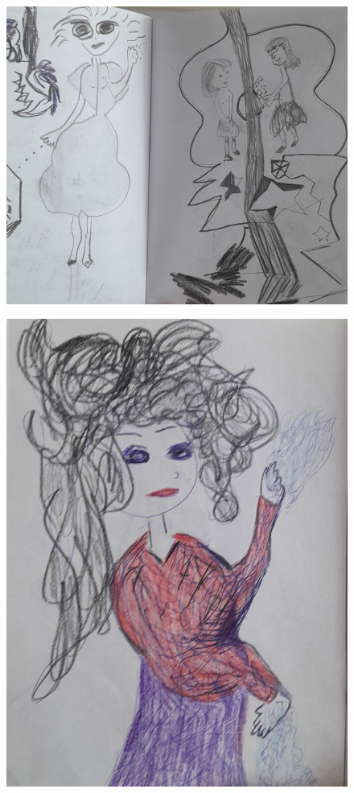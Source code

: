 \documentclass[12pt, a4paper, twoside]{book} %
\begin{document}
\begin{figure}[H]
	\centering
	\includegraphics[width=\textwidth]{./images/1f81324df24ae9.jpg}
\end{figure}

\begin{figure}[H]
	\centering
	\includegraphics[width=\textwidth]{./images/1f81324df206df.jpg}
\end{figure}
\end{document}
